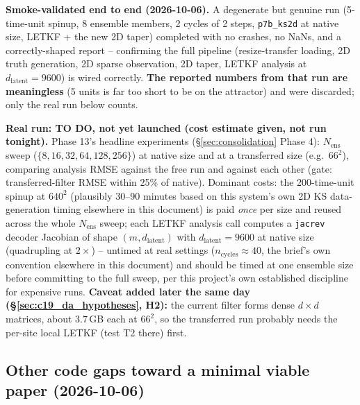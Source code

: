 \documentclass[11pt]{article}
\begin{document}
\textbf{Smoke-validated end to end (2026-10-06).} A degenerate but
genuine run (5-time-unit spinup, 8 ensemble members, 2 cycles of 2
steps, \texttt{p7b\_ks2d} at native size, LETKF + the new 2D taper)
completed with no crashes, no NaNs, and a correctly-shaped report --
confirming the full pipeline (resize-transfer loading, 2D truth
generation, 2D sparse observation, 2D taper, LETKF analysis at
$d_{\mathrm{latent}}{=}9600$) is wired correctly. \textbf{The reported
numbers from that run are meaningless} (5 units is far too short to be
on the attractor) and were discarded; only the real run below counts.

\textbf{Real run: TO DO, not yet launched (cost estimate given, not
run tonight).} Phase 13's headline experiments
(\S\ref{sec:consolidation} Phase 4): $N_{\mathrm{ens}}$ sweep
($\{8,16,32,64,128,256\}$) at native size and at a transferred size
(e.g.\ $66^2$), comparing analysis RMSE against the free run and against
each other (gate: transferred-filter RMSE within 25\% of native).
Dominant costs: the 200-time-unit spinup at $640^2$ (plausibly
30--90 minutes based on this system's own 2D KS data-generation timing
elsewhere in this document) is paid \emph{once} per size and reused
across the whole $N_{\mathrm{ens}}$ sweep; each LETKF analysis call
computes a \texttt{jacrev} decoder Jacobian of shape
$(m, d_{\mathrm{latent}})$ with $d_{\mathrm{latent}}{=}9600$ at native
size (quadrupling at $2\times$) -- untimed at real settings
($n_{\mathrm{cycles}}{\approx}40$, the brief's own convention elsewhere
in this document) and should be timed at one ensemble size before
committing to the full sweep, per this project's own established
discipline for expensive runs. \textbf{Caveat added later the same day
(\S\ref{sec:c19_da_hypotheses}, H2):} the current filter forms dense
$d\times d$ matrices, about $3.7$\,GB each at $66^2$, so the transferred
run probably needs the per-site local LETKF (test T2 there) first.

\subsection{Other code gaps toward a minimal viable paper (2026-10-06)}
\label{sec:mvp_gaps}
\end{document}

